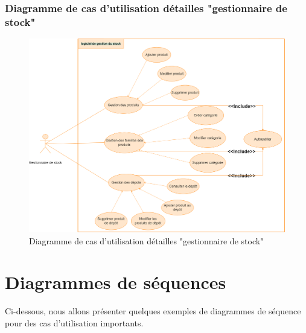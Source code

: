 \documentclass[edit,12pt,a4paper,ChapStyle,oneside,doubleinterligne]{report}
\begin{document}
\subsubsection{Diagramme de cas d'utilisation détailles "gestionnaire de stock" }
\begin{figure}[h!]\label{fig:diagramme de cas d'utilisation détailles "Gestionnaire de stock"}
\centering
\includegraphics[width=1\textwidth]{images/usecas GS.png}
\caption{Diagramme de cas d'utilisation détailles "gestionnaire de stock"}
\end{figure}\clearpage


\section{Diagrammes de séquences}
Ci-dessous, nous allons présenter quelques exemples de diagrammes de séquence pour des cas d'utilisation importants.
\end{document}
